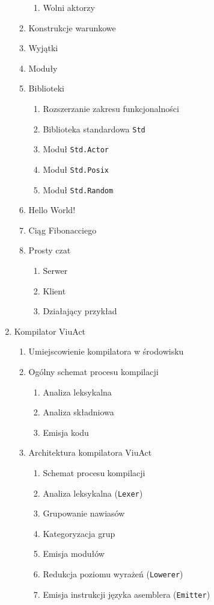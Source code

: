 \documentclass[11pt,oneside,a4paper,twocolumn]{article}
\begin{document}
\begin{enumerate}
\begin{enumerate}
\begin{enumerate}
			\item Wolni aktorzy
		\end{enumerate}
		\item Konstrukcje warunkowe
		\item Wyjątki
		\item Moduły
		\item Biblioteki
		\begin{enumerate}
			\item Rozszerzanie zakresu funkcjonalności
			\item Biblioteka standardowa \texttt{Std}
			\item Moduł \texttt{Std.Actor}
			\item Moduł \texttt{Std.Posix}
			\item Moduł \texttt{Std.Random}
		\end{enumerate}
		
		\item Hello World!
		\item Ciąg Fibonacciego
		\item Prosty czat
		\begin{enumerate}
			\item Serwer
			\item Klient
			\item Działający przykład
		\end{enumerate}
	\end{enumerate}
	
	\item Kompilator ViuAct
	\begin{enumerate}
		\item Umiejscowienie kompilatora w środowisku
		
		\item Ogólny schemat procesu kompilacji
		\begin{enumerate}
			\item Analiza leksykalna
			\item Analiza składniowa
			\item Emisja kodu
		\end{enumerate}
		
		\item Architektura kompilatora ViuAct
		\begin{enumerate}
			\item Schemat procesu kompilacji
			\item Analiza leksykalna (\texttt{Lexer})
			\item Grupowanie nawiasów
			\item Kategoryzacja grup
			\item Emisja modułów
			\item Redukcja poziomu wyrażeń (\texttt{Lowerer})
			\item Emisja instrukcji języka asemblera (\texttt{Emitter})
		\end{enumerate}
		

\end{enumerate}
\end{enumerate}
\end{document}
